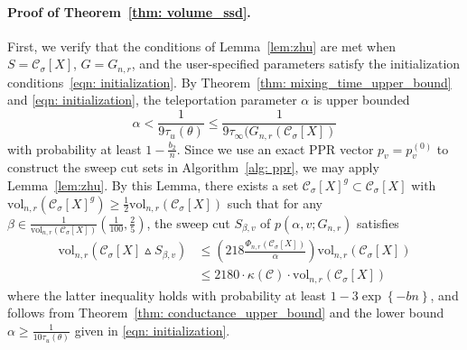 \documentclass[11pt,twoside]{article}
\theoremstyle{definition}
\newcommand{\set}[1]{\left\{#1\right\}}
\newcommand{\vol}{\mathrm{vol}}
\newcommand{\1}{\mathbbm{1}}
\newcommand{\taubf}{\tau_{u}}
\newcommand{\Xbf}{X}
\newcommand{\Cset}{\mathcal{C}}
\newcommand{\Csig}{\Cset_{\sigma}}
\begin{document}
\paragraph{Proof of Theorem~\ref{thm: volume_ssd}.}
First, we verify that the conditions of Lemma~\ref{lem:zhu} are met when $S = \Cset_{\sigma}[\Xbf]$, $G = G_{n,r}$, and the user-specified parameters satisfy the initialization conditions~\eqref{eqn: initialization}. By Theorem~\ref{thm: mixing_time_upper_bound} and \eqref{eqn: initialization}, the teleportation parameter $\alpha$ is upper bounded
\begin{equation*}
\alpha < \frac{1}{9\taubf(\theta)} \leq \frac{1}{9\tau_\infty(G_{n,r}(\Cset_{\sigma}[\Xbf])}
\end{equation*}
with probability at least $1 - \frac{b_2}{n}$. Since we use an exact PPR vector $p_v = p_v^{(0)}$ to construct the sweep cut sets in Algorithm~\ref{alg: ppr}, we may apply Lemma~\ref{lem:zhu}. By this Lemma, there exists a set $\Csig[\Xbf]^g \subset \Csig[\Xbf]$ with $\vol_{n,r}(\Csig[\Xbf]^g) \geq \frac{1}{2}\vol_{n,r}(\Csig[\Xbf])$ such that for any $\beta \in \frac{1}{\vol_{n,r}(\Csig[\Xbf])}(\frac{1}{100},\frac{2}{5})$, the sweep cut $S_{\beta,v}$ of $p(\alpha, v; G_{n,r})$ satisfies
\begin{align}
\vol_{n,r}(\Csig[\Xbf] \vartriangle S_{\beta,v}) & \leq \left(218\frac{\Phi_{n,r}(\Csig[\Xbf])}{\alpha}\right) \vol_{n,r}(\Csig[\Xbf]) \nonumber \\
& \leq 2180 \cdot\kappa(\Cset)\cdot\vol_{n,r}(\Csig[\Xbf]) \label{eqn:volume_ssd_pf1}
\end{align}
where the latter inequality holds with probability at least $1 - 3\exp\set{-bn}$, and follows from Theorem~\ref{thm: conductance_upper_bound} and the lower bound $\alpha \geq \frac{1}{10 \tau_u(\theta)}$ given in \eqref{eqn: initialization}. 
\end{document}
